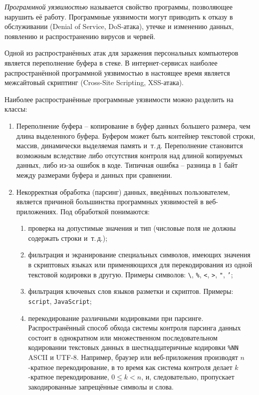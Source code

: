 \emph{Программной уязвимостью} называется свойство программы, позволяющее нарушить её работу. Программные уязвимости могут приводить к отказу в обслуживании (Denial of Service, DoS-атака), утечке и изменению данных, появлению и распространению вирусов и червей.

Одной из распространённых атак для заражения персональных компьютеров является переполнение буфера в стеке. В интернет-сервисах наиболее распространённой программной уязвимостью в настоящее время является межсайтовый скриптинг (Cross-Site Scripting, XSS-атака).

Наиболее распространённые программные уязвимости можно разделить на классы:
\begin{enumerate}
    \item Переполнение буфера -- копирование в буфер данных большего размера, чем длина выделенного буфера. Буфером может быть контейнер текстовой строки, массив, динамически выделяемая память и~т.\,д. Переполнение становится возможным вследствие либо отсутствия контроля над длиной копируемых данных, либо из-за ошибок в коде. Типичная ошибка -- разница в 1 байт между размерами буфера и данных при сравнении.
    \item Некорректная обработка (парсинг) данных, введённых пользователем, является причиной большинства программных уязвимостей в веб-приложениях. Под обработкой понимаются:
        \begin{enumerate}
            \item проверка на допустимые значения и тип (числовые поля не должны содержать строки и~т.\,д.);
            \item фильтрация и экранирование специальных символов, имеющих значения в скриптовых языках или применяющихся для перекодирования из одной текстовой кодировки в другую. Примеры символов: \texttt{\textbackslash}, \texttt{\%}, \texttt{<}, \texttt{>}, \texttt{"}, \texttt{'};
            \item фильтрация ключевых слов языков разметки и скриптов. Примеры: \texttt{script}, \texttt{JavaScript};
            \item перекодирование различными кодировками при парсинге. Распространённый способ обхода системы контроля парсинга данных состоит в однократном или множественном последовательном кодировании текстовых данных в шестнадцатеричные кодировки \texttt{\%NN} ASCII и UTF-8. Например, браузер или веб-приложения производят $n$-кратное перекодирование, в то время как система контроля делает $k$-кратное перекодирование, $0 \leq k < n$, и, следовательно, пропускает закодированные запрещённые символы и слова.

\end{enumerate}
\end{enumerate}
